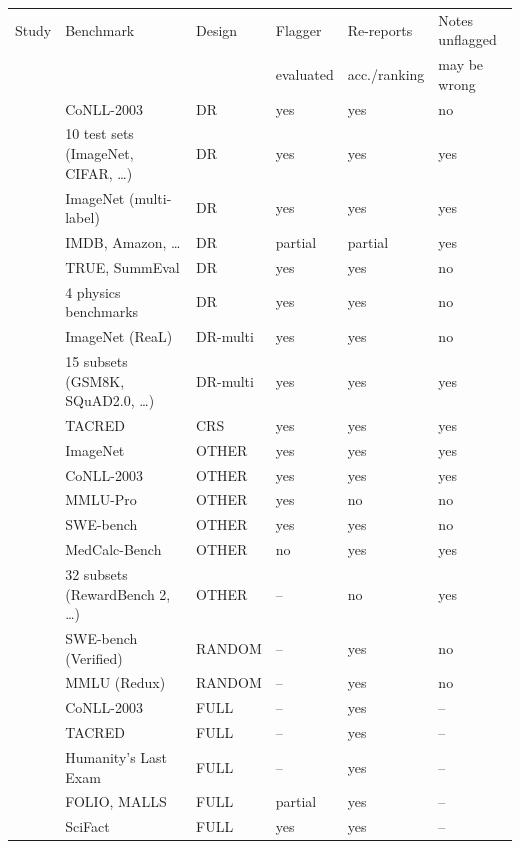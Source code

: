 \begin{tabular}{llllll}
\toprule
Study & Benchmark & Design & Flagger & Re-reports & Notes unflagged \\
 & & & evaluated & acc./ranking & may be wrong \\
\midrule
\citet{reiss2020identifying} & CoNLL-2003 & DR & yes & yes & no \\
\citet{northcutt2021pervasive} & 10 test sets (ImageNet, CIFAR, \dots) & DR & yes & yes & yes \\
\citet{vasudevan2022when} & ImageNet (multi-label) & DR & yes & yes & yes \\
\citet{chong2022detecting} & IMDB, Amazon, \dots & DR & partial & partial & yes \\
\citet{nahum2025are} & TRUE, SummEval & DR & yes & yes & no \\
\citet{ansari2026how} & 4 physics benchmarks & DR & yes & yes & no \\
\citet{beyer2020are} & ImageNet (ReaL) & DR-multi & yes & yes & no \\
\citet{vendrow2025do} & 15 subsets (GSM8K, SQuAD2.0, \dots) & DR-multi & yes & yes & yes \\
\citet{alt2020tacred} & TACRED & CRS & yes & yes & yes \\
\citet{shankar2020evaluating} & ImageNet & OTHER & yes & yes & yes \\
\citet{rucker2023cleanconll} & CoNLL-2003 & OTHER & yes & yes & yes \\
\citet{wang2024mmlupro} & MMLU-Pro & OTHER & yes & no & no \\
\citet{aleithan2024swebench} & SWE-bench & OTHER & yes & yes & no \\
\citet{ye2026scalable} & MedCalc-Bench & OTHER & no & yes & yes \\
\citet{land2026auditing} & 32 subsets (RewardBench 2, \dots) & OTHER & -- & no & yes \\
\citet{chowdhury2024introducing} & SWE-bench (Verified) & RANDOM & -- & yes & no \\
\citet{gema2025are} & MMLU (Redux) & RANDOM & -- & yes & no \\
\citet{wang2019crossweigh} & CoNLL-2003 & FULL & -- & yes & -- \\
\citet{stoica2021retacred} & TACRED & FULL & -- & yes & -- \\
\citet{zhai2026hleverified} & Humanity's Last Exam & FULL & -- & yes & -- \\
\citet{brunello2026fixing} & FOLIO, MALLS & FULL & partial & yes & -- \\
\citet{sylvestre2026gold} & SciFact & FULL & yes & yes & -- \\
\bottomrule
\end{tabular}
